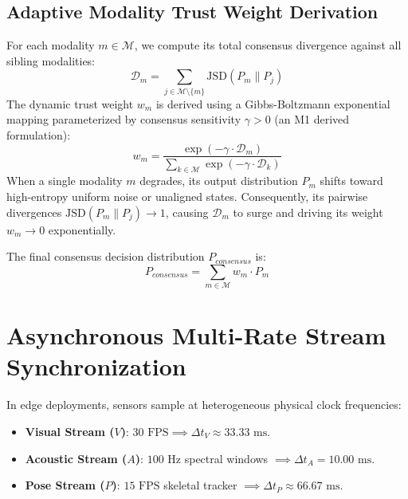 \documentclass[10pt,journal,compsoc]{IEEEtran}
\begin{document}
\subsection{Adaptive Modality Trust Weight Derivation}
For each modality $m \in \mathcal{M}$, we compute its total consensus divergence against all sibling modalities:
\begin{equation}
\mathcal{D}_m = \sum_{j \in \mathcal{M} \setminus \{m\}} \text{JSD}(P_m \parallel P_j)
\end{equation}
The dynamic trust weight $w_m$ is derived using a Gibbs-Boltzmann exponential mapping parameterized by consensus sensitivity $\gamma > 0$ (an M1 derived formulation):
\begin{equation}
w_m = \frac{\exp(-\gamma \cdot \mathcal{D}_m)}{\sum_{k \in \mathcal{M}} \exp(-\gamma \cdot \mathcal{D}_k)}
\end{equation}
When a single modality $m$ degrades, its output distribution $P_m$ shifts toward high-entropy uniform noise or unaligned states. Consequently, its pairwise divergences $\text{JSD}(P_m \parallel P_j) \to 1$, causing $\mathcal{D}_m$ to surge and driving its weight $w_m \to 0$ exponentially.

The final consensus decision distribution $P_{consensus}$ is:
\begin{equation}
P_{consensus} = \sum_{m \in \mathcal{M}} w_m \cdot P_m
\end{equation}

\section{Asynchronous Multi-Rate Stream Synchronization}
In edge deployments, sensors sample at heterogeneous physical clock frequencies:
\begin{itemize}
    \item \textbf{Visual Stream ($V$)}: $30\text{ FPS} \implies \Delta t_V \approx 33.33\text{ ms}$.
    \item \textbf{Acoustic Stream ($A$)}: $100\text{ Hz}$ spectral windows $\implies \Delta t_A = 10.00\text{ ms}$.
    \item \textbf{Pose Stream ($P$)}: $15\text{ FPS}$ skeletal tracker $\implies \Delta t_P \approx 66.67\text{ ms}$.
\end{itemize}
\end{document}
